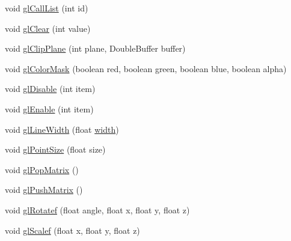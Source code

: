 \begin{DoxyCompactItemize}
\item 
void \mbox{\hyperlink{classorg_1_1newdawn_1_1slick_1_1opengl_1_1renderer_1_1_v_a_o_g_l_renderer_a555f7675fbd042770b6bf759169a48a6}{gl\+Call\+List}} (int id)
\item 
void \mbox{\hyperlink{classorg_1_1newdawn_1_1slick_1_1opengl_1_1renderer_1_1_v_a_o_g_l_renderer_a5176ec9b2344f1fc899dac99cb34291d}{gl\+Clear}} (int value)
\item 
void \mbox{\hyperlink{classorg_1_1newdawn_1_1slick_1_1opengl_1_1renderer_1_1_v_a_o_g_l_renderer_a0d0e37d7a7a2ff0ac6721d3136a3f110}{gl\+Clip\+Plane}} (int plane, Double\+Buffer buffer)
\item 
void \mbox{\hyperlink{classorg_1_1newdawn_1_1slick_1_1opengl_1_1renderer_1_1_v_a_o_g_l_renderer_a2929c99eb57e57280ade156ba6ebd46a}{gl\+Color\+Mask}} (boolean red, boolean green, boolean blue, boolean alpha)
\item 
void \mbox{\hyperlink{classorg_1_1newdawn_1_1slick_1_1opengl_1_1renderer_1_1_v_a_o_g_l_renderer_ad79f25ad984dc8c504495c628aaadb4e}{gl\+Disable}} (int item)
\item 
void \mbox{\hyperlink{classorg_1_1newdawn_1_1slick_1_1opengl_1_1renderer_1_1_v_a_o_g_l_renderer_a9da29b057439f8fdaffabe989241b3bd}{gl\+Enable}} (int item)
\item 
void \mbox{\hyperlink{classorg_1_1newdawn_1_1slick_1_1opengl_1_1renderer_1_1_v_a_o_g_l_renderer_a2dec01f79be6ca9a13fb785cb03dcdbc}{gl\+Line\+Width}} (float \mbox{\hyperlink{classorg_1_1newdawn_1_1slick_1_1opengl_1_1renderer_1_1_immediate_mode_o_g_l_renderer_a65d0a04d747368ea954f69074d9102d6}{width}})
\item 
void \mbox{\hyperlink{classorg_1_1newdawn_1_1slick_1_1opengl_1_1renderer_1_1_v_a_o_g_l_renderer_a51b4eb9ab5ed3efe4021472ffecb5041}{gl\+Point\+Size}} (float size)
\item 
void \mbox{\hyperlink{classorg_1_1newdawn_1_1slick_1_1opengl_1_1renderer_1_1_v_a_o_g_l_renderer_a9d7e65f8c87a2a10a24ef196a7f83d12}{gl\+Pop\+Matrix}} ()
\item 
void \mbox{\hyperlink{classorg_1_1newdawn_1_1slick_1_1opengl_1_1renderer_1_1_v_a_o_g_l_renderer_ac7380f97b774917d89fbb56270180be4}{gl\+Push\+Matrix}} ()
\item 
void \mbox{\hyperlink{classorg_1_1newdawn_1_1slick_1_1opengl_1_1renderer_1_1_v_a_o_g_l_renderer_adfa62351752a9cfcd8cced6c76b0e05f}{gl\+Rotatef}} (float angle, float x, float y, float z)
\item 
void \mbox{\hyperlink{classorg_1_1newdawn_1_1slick_1_1opengl_1_1renderer_1_1_v_a_o_g_l_renderer_a6bab623953faef3cac8d299201434b5f}{gl\+Scalef}} (float x, float y, float z)

\end{DoxyCompactItemize}
